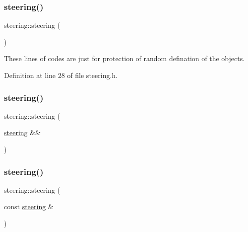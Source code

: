 \subsubsection{\texorpdfstring{steering()}{steering()}\hspace{0.1cm}{\footnotesize\ttfamily [1/3]}}
{\footnotesize\ttfamily steering\+::steering (\begin{DoxyParamCaption}{ }\end{DoxyParamCaption})\hspace{0.3cm}{\ttfamily [inline]}}



These lines of codes are just for protection of random defination of the objects. 



Definition at line 28 of file steering.\+h.

\mbox{\label{classsteering_ac941b5d9c6daae87122f984819606475}} 
\subsubsection{\texorpdfstring{steering()}{steering()}\hspace{0.1cm}{\footnotesize\ttfamily [2/3]}}
{\footnotesize\ttfamily steering\+::steering (\begin{DoxyParamCaption}\item[{\mbox{\hyperlink{classsteering}{steering}} \&\&}]{ }\end{DoxyParamCaption})\hspace{0.3cm}{\ttfamily [default]}}

\mbox{\label{classsteering_a5646ad884f0949253988d9a8ebec8278}} 
\subsubsection{\texorpdfstring{steering()}{steering()}\hspace{0.1cm}{\footnotesize\ttfamily [3/3]}}
{\footnotesize\ttfamily steering\+::steering (\begin{DoxyParamCaption}\item[{const \mbox{\hyperlink{classsteering}{steering}} \&}]{ }\end{DoxyParamCaption})\hspace{0.3cm}{\ttfamily [default]}}

